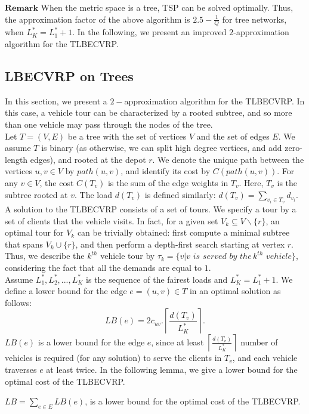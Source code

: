 \noindent $\mathbf{Remark}$ When the metric space is a tree, TSP can be solved optimally. Thus, the approximation factor of the above algorithm is $2.5-\frac{1}{Q}$ for tree networks, when $L_K^*=L_1^*+1$. In the following, we present an improved $2$-approximation algorithm for the TLBECVRP.
\subsection{LBECVRP on Trees}
\noindent In this section, we present a $2-$approximation algorithm for the TLBECVRP. In this case, a vehicle tour can be characterized by a rooted subtree, and so more than one vehicle may pass through the nodes of the tree. \\
\indent  Let $T=(V,E)$ be a tree with the set of vertices $V$ and the set of edges $E$. We assume $T$ is binary (as otherwise, we can split high degree vertices, and add zero-length edges), and rooted at the depot $r$. We denote the unique path between the vertices $u,v \in V$ by $path(u,v)$, and identify its cost by $C(path(u,v))$. For any $v \in V$, the cost $C(T_v)$ is the sum of the edge weights in $T_v$. Here, $T_v$ is the subtree rooted at $v$. The load $d(T_v)$ is defined similarly: $d(T_v)=\sum_{v_i \in T_v}d_{v_i}$. A solution to the TLBECVRP consists of a set of tours. We specify a tour by a set of clients that the vehicle visits. In fact, for a given set $V_k \subseteq V \backslash \{ r\}$, an optimal tour for $V_k$ can be trivially obtained: first compute a minimal subtree that spans $V_k \cup \{ r\}$, and then perform a depth-first search starting at vertex $r$. Thus, we describe the $k^{th}$ vehicle tour by ${\tau_k}= \{ v|v\,\,is\,\,served\,\,by\,\,the\,k^{th}\,\,vehicle\}$, considering the fact that all the demands are equal to $1$. \\
\indent Assume $L^*_1, L^*_2, ..., L_K^*$ is the sequence of the fairest loads and $L^*_K= L^*_1+1$. We define a lower bound for the edge $e=(u,v) \in T$ in an optimal solution as follows:
$$LB(e) = 2c_{uv}.\left\lceil {\frac{d(T_v)}{L^*_K}} \right\rceil.$$
\indent $LB(e)$ is a lower bound for the edge $e$, since at least $\left\lceil {\frac{d(T_v)}{L^*_K}} \right\rceil$ number of vehicles is required (for any solution) to serve the clients in $T_v$, and each vehicle traverses $e$ at least twice. In the following lemma, we give a lower bound for the optimal cost of the TLBECVRP.
\begin{lemma}
$LB =\sum _{e \in E} LB(e)$, is a lower bound for the optimal cost of the TLBECVRP.
\end{lemma}

